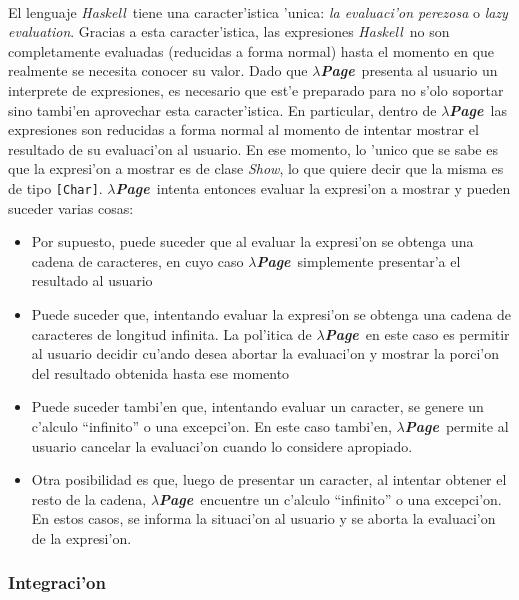 \documentclass[a4paper]{article}
\newcommand{\haskell}{\textsl{Haskell}}
\newcommand{\hpage}{\textbf{\textsl{$\lambda$Page}}}
\begin{document}
\paragraph{}El lenguaje \haskell\ tiene una caracter'istica 'unica: \textsl{la evaluaci'on perezosa} o \textsl{lazy evaluation}.  Gracias a esta caracter'istica, las expresiones \haskell\ no son completamente evaluadas (reducidas a forma normal) hasta el momento en que realmente se necesita conocer su valor.  Dado que \hpage\ presenta al usuario un interprete de expresiones, es necesario que est'e preparado para no s'olo soportar sino tambi'en aprovechar esta caracter'istica.  En particular, dentro de \hpage\ las expresiones son reducidas a forma normal al momento de intentar mostrar el resultado de su evaluaci'on al usuario.  En ese momento, lo 'unico que se sabe es que la expresi'on a mostrar es de clase \textsl{Show}, lo que quiere decir que la misma es de tipo \texttt{[Char]}.  \hpage\ intenta entonces evaluar la expresi'on a mostrar y pueden suceder varias cosas:
\begin{itemize}
	\item Por supuesto, puede suceder que al evaluar la expresi'on se obtenga una cadena de caracteres, en cuyo caso \hpage\ simplemente presentar'a el resultado al usuario
	\item Puede suceder que, intentando evaluar la expresi'on se obtenga una cadena de caracteres de longitud infinita.  La pol'itica de \hpage\ en este caso es permitir al usuario decidir cu'ando desea abortar la evaluaci'on y mostrar la porci'on del resultado obtenida hasta ese momento
	\item Puede suceder tambi'en que, intentando evaluar un caracter, se genere un c'alculo ``infinito'' o una excepci'on.  En este caso tambi'en, \hpage\ permite al usuario cancelar la evaluaci'on cuando lo considere apropiado.
	\item Otra posibilidad es que, luego de presentar un caracter, al intentar obtener el resto de la cadena, \hpage\ encuentre un c'alculo ``infinito'' o una excepci'on.  En estos casos, se informa la situaci'on al usuario y se aborta la evaluaci'on de la expresi'on.
\end{itemize}
\subsubsection{Integraci'on}
\end{document}
